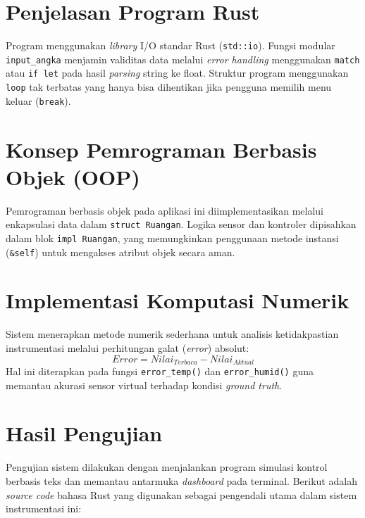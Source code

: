 \documentclass[12pt, a4paper]{article}
\begin{document}
\newpage
\section{Penjelasan Program Rust}
Program menggunakan \textit{library} I/O standar Rust (\texttt{std::io}). Fungsi modular \texttt{input\_angka} menjamin validitas data melalui \textit{error handling} menggunakan \texttt{match} atau \texttt{if let} pada hasil \textit{parsing} string ke float. Struktur program menggunakan \texttt{loop} tak terbatas yang hanya bisa dihentikan jika pengguna memilih menu keluar (\texttt{break}).

\section{Konsep Pemrograman Berbasis Objek (OOP)}
Pemrograman berbasis objek pada aplikasi ini diimplementasikan melalui enkapsulasi data dalam \texttt{struct Ruangan}. Logika sensor dan kontroler dipisahkan dalam blok \texttt{impl Ruangan}, yang memungkinkan penggunaan metode instansi (\texttt{\&self}) untuk mengakses atribut objek secara aman.

\section{Implementasi Komputasi Numerik}
Sistem menerapkan metode numerik sederhana untuk analisis ketidakpastian instrumentasi melalui perhitungan galat (\textit{error}) absolut:
\begin{equation}
    Error = Nilai_{Terbaca} - Nilai_{Aktual}
\end{equation}
Hal ini diterapkan pada fungsi \texttt{error\_temp()} dan \texttt{error\_humid()} guna memantau akurasi sensor virtual terhadap kondisi \textit{ground truth}.
\section{Hasil Pengujian}

Pengujian sistem dilakukan dengan menjalankan program simulasi kontrol berbasis teks dan memantau antarmuka \textit{dashboard} pada terminal. Berikut adalah \textit{source code} bahasa Rust yang digunakan sebagai pengendali utama dalam sistem instrumentasi ini:
\end{document}
